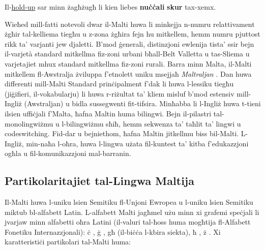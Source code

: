\begin{multicols}{2}
\begin{examples}
\item Il-\underline{hold-up} sar minn żagħżugħ li kien liebes \textbf{nuċċali} \textbf{skur} tax-xemx.
\end{examples}


Wieħed mill-fatti notevoli dwar il-Malti huwa li minkejja n-numru relattivament żgħir tal-kelliema tiegħu u z-zona żgħira fejn hu mitkellem, hemm numru pjuttost rikk ta’ varjanti jew djaletti. B’mod ġenerali, distinzjoni ewlenija tista’ ssir bejn il-varjetà standard mitkellma fiz-zoni urbani bħall-Belt Valletta u tas-Sliema u varjetajiet mhux standard mitkellma fiz-zoni rurali. Barra minn Malta, il-Malti mitkellem fl-Awstralja żviluppa f’etnolett uniku msejjaħ \emph{Maltraljan} \cite{Bovingdon:2001}. Dan huwa differenti mill-Malti Standard prinċipalment f'dak li huwa l-lessiku tiegħu (jiġifieri, il-vokabularju) li huwa r-riżultat ta’ kliem misluf b’mod estensiv mill- Ingliż (Awstraljan) u bidla sussegwenti fit-tifsira. 
Minħabba li l-Ingliż huwa t-tieni ilsien uffiċjali f'Malta, ħafna Maltin huma bilingwi. Bejn il-pilastri tal-monolingwiżmu u l-bilingwiżmu sħiħ, hemm sekwenza ta’ taħlit ta’ lingwi u codeswitching. Fid-dar u bejniethom, ħafna Maltin jitkellmu biss bil-Malti. L-Ingliż, min-naħa l-oħra, huwa l-lingwa użata fil-kuntest ta’ kitba f’edukazzjoni ogħla u fil-komunikazzjoni mal-barranin.

\subsection{Partikolaritajiet tal-Lingwa Maltija}

Il-Malti huwa l-uniku lsien Semitiku fl-Unjoni Ewropea u l-uniku lsien Semitiku miktub bl-alfabett Latin. L-alfabett Malti jagħmel użu minn xi grafemi speċjali li jvarjaw minn alfabetti oħra Latini (il-valuri tal-ħoss huma mogħtija fl-Alfabett Fonetiku Internazzjonali): 
ċ , ġ , għ (il-biċċa l-kbira siekta), ħ , ż  \cite{Fabri:2011a,Borg-Alexander:1997}. Xi karatteristiċi partikolari tal-Malti huma:


\end{multicols}
